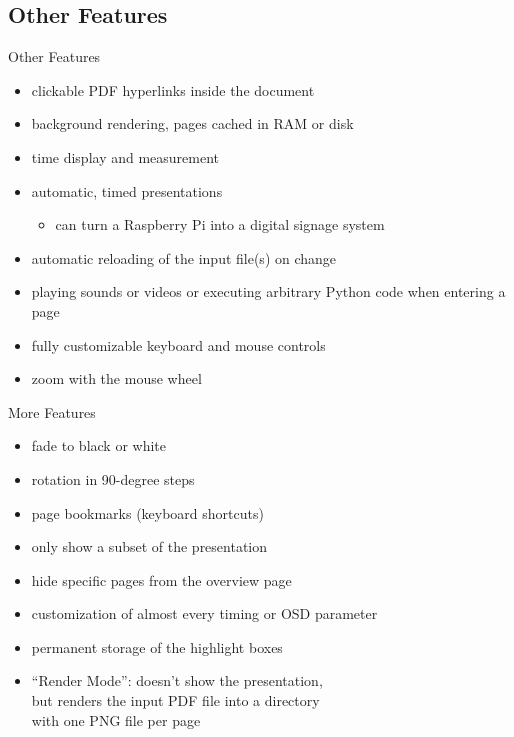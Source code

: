\documentclass[bigger,hyperref={colorlinks=true,linkcolor=white,urlcolor=blue}]{beamer}
\begin{document}
\subsection{Other Features}
\begin{frame}{Other Features}
    \begin{itemize}
        \item clickable PDF hyperlinks inside the document
        \item background rendering, pages cached in RAM or disk
        \item time display and measurement
        \item automatic, timed presentations
        \begin{itemize}
            \item can turn a Raspberry Pi into a digital signage system
        \end{itemize}
        \item automatic reloading of the input file(s) on change
        \item playing sounds or videos or executing arbitrary Python code
              when entering a page
        \item fully customizable keyboard and mouse controls
        \item zoom with the mouse wheel
    \end{itemize}
\end{frame}
\begin{frame}{More Features}
    \begin{itemize}
        \item fade to black or white
        \item rotation in 90-degree steps
        \item page bookmarks (keyboard shortcuts)
        \item only show a subset of the presentation
        \item hide specific pages from the overview page
        \item customization of almost every timing or OSD parameter
        \item permanent storage of the highlight boxes
        \item ``Render Mode'': doesn't show the presentation, \\
              but renders the input PDF file into a directory \\
              with one PNG file per page
    \end{itemize}
\end{frame}
\end{document}
